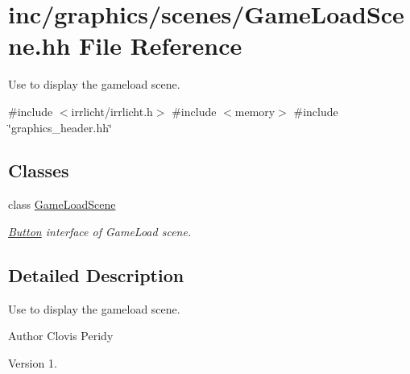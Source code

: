 \hypertarget{GameLoadScene_8hh}{}\section{inc/graphics/scenes/\+Game\+Load\+Scene.hh File Reference}
\label{GameLoadScene_8hh}


Use to display the gameload scene.  


{\ttfamily \#include $<$irrlicht/irrlicht.\+h$>$}\newline
{\ttfamily \#include $<$memory$>$}\newline
{\ttfamily \#include \char`\"{}graphics\+\_\+header.\+hh\char`\"{}}\newline
\subsection*{Classes}
\begin{DoxyCompactItemize}
\item 
class \hyperlink{classGameLoadScene}{Game\+Load\+Scene}
\begin{DoxyCompactList}\small\item\em \hyperlink{classButton}{Button} interface of Game\+Load scene. \end{DoxyCompactList}\end{DoxyCompactItemize}


\subsection{Detailed Description}
Use to display the gameload scene. 

\begin{DoxyAuthor}{Author}
Clovis Peridy 
\end{DoxyAuthor}
\begin{DoxyVersion}{Version}
1. 
\end{DoxyVersion}
